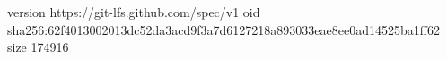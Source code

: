 version https://git-lfs.github.com/spec/v1
oid sha256:62f4013002013dc52da3acd9f3a7d6127218a893033eae8ee0ad14525ba1ff62
size 174916
